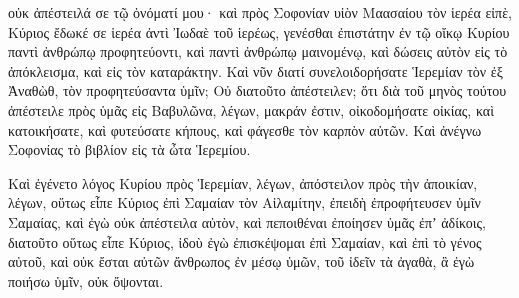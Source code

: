 {οὐκ ἀπέστειλά σε τῷ ὀνόματί μου· καὶ πρὸς Σοφονίαν υἱὸν Μαασαίου τὸν ἱερέα εἰπὲ,
Κύριος ἔδωκέ σε ἱερέα ἀντὶ Ἰωδαὲ τοῦ ἱερέως, γενέσθαι ἐπιστάτην ἐν τῷ οἴκῳ Κυρίου παντὶ ἀνθρώπῳ προφητεύοντι, καὶ παντὶ ἀνθρώπῳ μαινομένῳ, καὶ δώσεις αὐτὸν εἰς τὸ ἀπόκλεισμα, καὶ εἰς τὸν καταράκτην.
Καὶ νῦν διατί συνελοιδορήσατε Ἱερεμίαν τὸν ἐξ Ἀναθὼθ, τὸν προφητεύσαντα ὑμῖν;
Οὐ διατοῦτο ἀπέστειλεν; ὅτι διὰ τοῦ μηνὸς τούτου ἀπέστειλε πρὸς ὑμᾶς εἰς Βαβυλῶνα, λέγων, μακράν ἐστιν, οἰκοδομήσατε οἰκίας, καὶ κατοικήσατε, καὶ φυτεύσατε κήπους, καὶ φάγεσθε τὸν καρπὸν αὐτῶν.
Καὶ ἀνέγνω Σοφονίας τὸ βιβλίον εἰς τὰ ὦτα Ἱερεμίου.
\par }{\PP {}Καὶ ἐγένετο λόγος Κυρίου πρὸς Ἱερεμίαν, λέγων,
ἀπόστειλον πρὸς τὴν ἀποικίαν, λέγων, οὕτως εἶπε Κύριος ἐπὶ Σαμαίαν τὸν Αἰλαμίτην, ἐπειδὴ ἐπροφήτευσεν ὑμῖν Σαμαίας, καὶ ἐγὼ οὐκ ἀπέστειλα αὐτὸν, καὶ πεποιθέναι ἐποίησεν ὑμᾶς ἐπʼ ἀδίκοις,
διατοῦτο οὕτως εἶπε Κύριος, ἰδοὺ ἐγὼ ἐπισκέψομαι ἐπὶ Σαμαίαν, καὶ ἐπὶ τὸ γένος αὐτοῦ, καὶ οὐκ ἔσται αὐτῶν ἄνθρωπος ἐν μέσῳ ὑμῶν, τοῦ ἰδεῖν τὰ ἀγαθὰ, ἃ ἐγὼ ποιήσω ὑμῖν, οὐκ ὄψονται.

}
